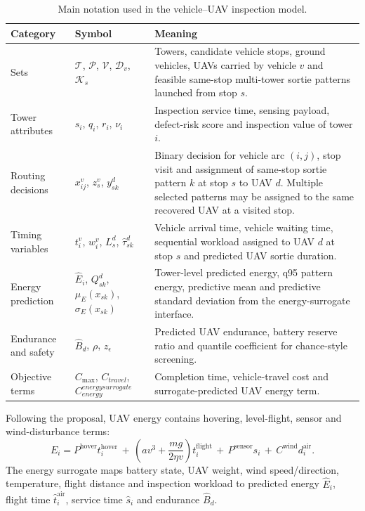 \documentclass[final,5p,twocolumn,number,nopreprintline]{elsarticle}
\newcommand{\rev}[1]{{\color{blue}#1}}
\begin{document}
\begin{table}[t]
\centering
\caption{Main notation used in the vehicle--UAV inspection model.}
\label{tab:notation}
{\scriptsize
\setlength{\tabcolsep}{3pt}
\renewcommand{\arraystretch}{0.95}
\begin{tabularx}{\textwidth}{@{}llX@{}}
\toprule
Category & Symbol & Meaning \\
\midrule
Sets & $\mathcal{T}$, $\mathcal{P}$, $\mathcal{V}$, $\mathcal{D}_v$, $\mathcal{K}_s$ & \rev{Towers, candidate vehicle stops, ground vehicles, UAVs carried by vehicle $v$ and feasible same-stop multi-tower sortie patterns launched from stop $s$.} \\
Tower attributes & $s_i$, $q_i$, $r_i$, $\nu_i$ & Inspection service time, sensing payload, defect-risk score and inspection value of tower $i$. \\
Routing decisions & $x^v_{ij}$, $z_s^v$, $y^d_{sk}$ & \rev{Binary decision for vehicle arc $(i,j)$, stop visit and assignment of same-stop sortie pattern $k$ at stop $s$ to UAV $d$. Multiple selected patterns may be assigned to the same recovered UAV at a visited stop.} \\
Timing variables & $t_i^v$, $w_i^v$, $L_s^d$, $\hat\tau^d_{sk}$ & \rev{Vehicle arrival time, vehicle waiting time, sequential workload assigned to UAV $d$ at stop $s$ and predicted UAV sortie duration.} \\
Energy prediction & $\hat E_i$, $Q^d_{sk}$, $\mu_E(x_{sk})$, $\sigma_E(x_{sk})$ & \rev{Tower-level predicted energy, q95 pattern energy, predictive mean and predictive standard deviation from the energy-surrogate interface.} \\
Endurance and safety & $\hat B_d$, $\rho$, $z_\epsilon$ & Predicted UAV endurance, battery reserve ratio and quantile coefficient for chance-style screening. \\
Objective terms & $C_{\max}$, $C_{travel}$, $C^{energy surrogate}_{energy}$ & Completion time, vehicle-travel cost and surrogate-predicted UAV energy term. \\
\bottomrule
\end{tabularx}
}
\end{table}

Following the proposal, UAV energy contains hovering, level-flight, sensor and wind-disturbance terms:
\begin{equation}
E_i=P^{\mathrm{hover}}t_i^{\mathrm{hover}}
\,+\,\left(a v^3+\frac{m g}{2\eta v}\right)t_i^{\mathrm{flight}}
\,+\,P^{\mathrm{sensor}}s_i
\,+\,C^{\mathrm{wind}}d_i^{\mathrm{air}} .
\label{eq:energy}
\end{equation}
The energy surrogate maps battery state, UAV weight, wind speed/direction, temperature, flight distance and inspection workload to predicted energy $\hat E_i$, flight time $\hat t^{\mathrm{air}}_i$, service time $\hat s_i$ and endurance $\hat B_d$.
\end{document}
